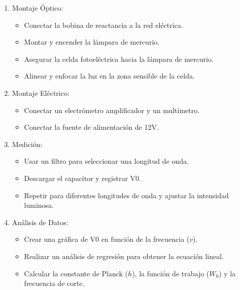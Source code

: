 \documentclass[twocolumn, 12pt]{article}
\begin{document}
\begin{enumerate}
      \item Montaje Óptico:
            \begin{itemize}[label=$\triangleright$]
                  \item Conectar la bobina de reactancia a la red eléctrica.
                  \item Montar y encender la lámpara de mercurio.
                  \item Asegurar la celda fotoeléctrica hacia la lámpara de
                        mercurio.
                  \item Alinear y enfocar la luz en la zona sensible de la celda.
            \end{itemize}

      \item Montaje Eléctrico:
            \begin{itemize}[label=$\triangleright$]
                  \item Conectar un electrómetro amplificador y un multímetro.
                  \item Conectar la fuente de alimentación de 12V.
            \end{itemize}

      \item Medición:
            \begin{itemize}[label=$\triangleright$]
                  \item Usar un filtro para seleccionar una longitud de onda.
                  \item Descargar el capacitor y registrar V0.
                  \item Repetir para diferentes longitudes de onda y ajustar la
                        intensidad luminosa.
            \end{itemize}

      \item Análisis de Datos:
            \begin{itemize}[label=$\triangleright$]
                  \item Crear una gráfica de V0 en función de la frecuencia ($v$).
                  \item Realizar un análisis de regresión para obtener la ecuación
                        lineal.
                  \item Calcular la constante de Planck ($h$), la función de
                        trabajo ($W_0$) y la frecuencia de corte.
            \end{itemize}
\end{enumerate}
\end{document}
